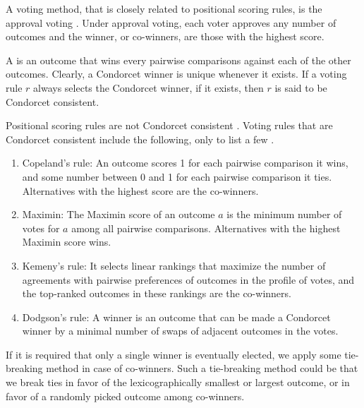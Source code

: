 A voting method, that is closely related to positional scoring rules, is
the approval voting \cite{BraFis}.
Under approval voting, each voter approves any number of outcomes
and the winner, or co-winners, are those with the highest score.

A  is an outcome that wins every pairwise comparisons
against each of the other outcomes.
Clearly, a Condorcet winner is unique whenever it exists.
If a voting rule $r$ always selects the Condorcet winner,
if it exists, then $r$ is said to be Condorcet consistent.

Positional scoring rules are not Condorcet consistent \cite{Fis}.
Voting rules that are Condorcet consistent include the following,
only to list a few \cite{Brandt:COMSOC}.
\begin{enumerate} \itemsep -4pt
	\item Copeland's rule: An outcome scores 1 for each pairwise comparison
				it wins, and some number between 0 and 1 for each pairwise comparison
				it ties.  Alternatives with the highest score are the co-winners.
	\item Maximin: The Maximin score of an outcome $a$ is the minimum number of
				votes for $a$ among all pairwise comparisons.  
				Alternatives with the highest Maximin score wins.
	\item Kemeny's rule: It selects linear rankings that maximize the number of agreements 
				with pairwise preferences of outcomes in the profile of votes, and
				the top-ranked outcomes in these rankings are the co-winners.
	\item Dodgson's rule: A winner is an outcome that can be made a Condorcet winner 
				by a minimal number of swaps of adjacent outcomes in the votes.
\end{enumerate}

If it is required that only a single winner is eventually elected,
we apply some tie-breaking method in case of co-winners.
Such a tie-breaking method could be that we break ties in favor of
the lexicographically smallest or largest outcome, or in favor of
a randomly picked outcome among co-winners.







